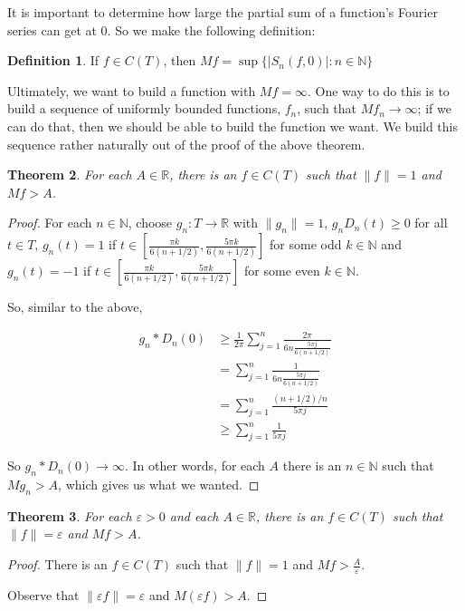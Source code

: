 \documentclass{amsart}
\newcommand{\vep}{\varepsilon}
\newcommand{\N}{\mathbb{N}}
\newcommand{\R}{\mathbb{R}}
\newcommand{\absval}[1]{\left| #1 \right|}
\newcommand{\norm}[1]{\|#1\|}
\newtheorem{thm}{Theorem}[section]
\theoremstyle{definition}
\newtheorem{definition}[thm]{Definition}
\begin{document}
It is important to determine how large the partial sum of a function's Fourier series can get at $0$. 
So we make the following definition:

\begin{definition}
If $f \in C(T)$, then $Mf = \sup\{\absval{S_n(f,0)} : n \in \N\}$ 
\end{definition}

Ultimately, we want to build a function with $Mf = \infty$.
One way to do this is to build a sequence of uniformly bounded functions, $f_n$, such that $Mf_n \to \infty$; 
if we can do that, then we should be able to build the function we want.
We build this sequence rather naturally out of the proof of the above theorem.

\begin{thm}
For each $A \in \R$, there is an $f \in C(T)$ such that $\norm{f} = 1$ and $Mf > A$. 
\end{thm}

\begin{proof}
For each $n \in \N$, choose $g_n: T \to \R$ with $\norm{g_n} = 1$, $g_nD_n(t) \geq 0$ for all $t \in T$,  $g_n(t) = 1$ if $t \in [\frac{\pi k}{6(n+1/2)},\frac{5 \pi k}{6(n+1/2)}]$ for some odd $k \in \N$  and $g_n(t) = -1$ if $t \in [\frac{\pi k}{6(n+1/2)},\frac{5 \pi k}{6(n+1/2)}]$ for some even $k \in \N$.

So, similar to the above,

\begin{align*}
g_n \ast D_n(0) &\geq \frac{1}{2 \pi} \sum\limits_{j=1}^n \frac{2 \pi}{6n \frac{5\pi j}{6(n+1/2)}}\\
&= \sum\limits_{j=1}^n \frac{1}{6n \frac{5\pi j}{6(n+1/2)}}\\
&= \sum\limits_{j=1}^n \frac{(n+1/2)/{n}}{5\pi j}\\
&\geq \sum\limits_{j=1}^n \frac{1}{5\pi j}
\end{align*}

So $g_n \ast D_n(0) \to \infty$. In other words, for each $A$ there is an $n \in \N$ such that $Mg_n > A$, which gives us what we wanted.

\end{proof}

\begin{thm}
For each $\vep >0$ and each $A \in \R$, there is an $f \in C(T)$ such that $\norm{f} = \vep $ and $Mf > A$. 

\end{thm}

\begin{proof}
There is an $f \in C(T)$ such that $\norm{f} = 1$ and $Mf > \frac{A}{\vep}$.

Observe that $\norm{\vep f} = \vep$ and $M(\vep f) > A$.

\end{proof}
\end{document}
